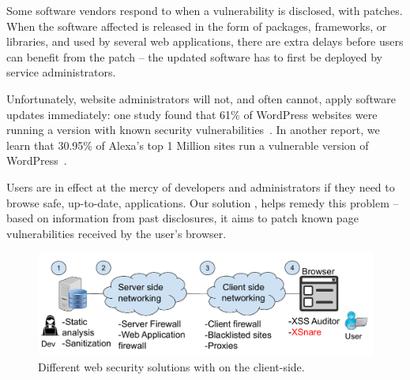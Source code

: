 Some software vendors respond to \xss when a vulnerability is
disclosed, with patches. When the software affected is released in
the form of packages, frameworks, or libraries, and used by several
web applications, there are extra delays before users can benefit from
the patch -- the updated software has to first be deployed by service
administrators.

Unfortunately, website administrators will not, and often cannot,
apply software updates immediately: one study found
that 61\% of WordPress websites were running a version with known
security vulnerabilities~\cite{Sucuri}. In another report, we learn
that 30.95\% of Alexa's top 1 Million sites run a vulnerable version
of WordPress~\cite{wpwhitesecurity}.

Users are in effect at the mercy of developers and administrators if
they need to browse safe, up-to-date, applications. Our solution \sys,
helps remedy this problem -- based on information from past disclosures,
it aims to patch known page vulnerabilities received by the user's browser.

\begin{figure}[h]
  \includegraphics[scale=0.37]{img/web_app_architecture.pdf}
  \vspace*{-5.0ex}
  \caption{Different web security solutions with \sys on the client-side.}
  \label{fig:web_architecture}
\end{figure}

